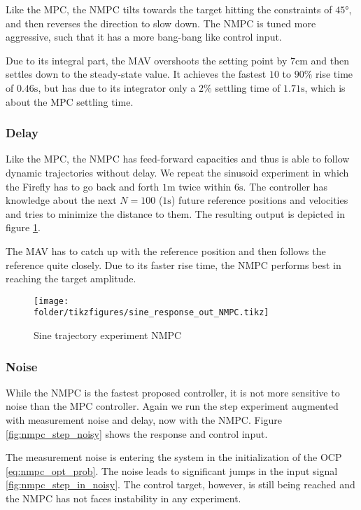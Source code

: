 Like the MPC, the NMPC tilts towards the target hitting the constraints of $45\si{\degree}$, and then reverses the direction to slow down. The NMPC is tuned more aggressive, such that it has a more bang-bang like control input. 

Due to its integral part, the MAV overshoots the setting point by $7\si{\centi\metre}$ and then settles down to the steady-state value. It achieves the fastest $10$ to $90\si{\percent}$ rise time of $0.46 \si{\second}$, but has due to its integrator only a $2\si{\percent}$ settling time of $1.71 \si{\second}$, which is about the MPC settling time.

\subsubsection{Delay}
Like the MPC, the NMPC has feed-forward capacities and thus is able to follow dynamic trajectories without delay. We repeat the sinusoid experiment in which the Firefly has to go back and forth $1\si{\metre}$ twice within $6 \si{\second}$. The controller has knowledge about the next $N=100$ ($1\si{\second}$) future reference positions and velocities and tries to minimize the distance to them. The resulting output is depicted in figure \ref{fig:nmpc_sine}.

The MAV has to catch up with the reference position and then follows the reference quite closely. Due to its faster rise time, the NMPC performs best in reaching the target amplitude.

\begin{figure}
\centering
\texttt{[image: \\folder/tikzfigures/sine\_response\_out\_NMPC.tikz]}
\caption{Sine trajectory experiment NMPC}
\label{fig:nmpc_sine}
\end{figure} 

\subsubsection{Noise}
While the NMPC is the fastest proposed controller, it is not more sensitive to noise than the MPC controller. Again we run the step experiment augmented with measurement noise and delay, now with the NMPC. Figure \ref{fig:nmpc_step_noisy} shows the response and control input. 

The measurement noise is entering the system in the initialization of the OCP \ref{eq:nmpc_opt_prob}. The noise leads to significant jumps in the input signal \ref{fig:nmpc_step_in_noisy}. The control target, however, is still being reached and the NMPC has not faces instability in any experiment.


